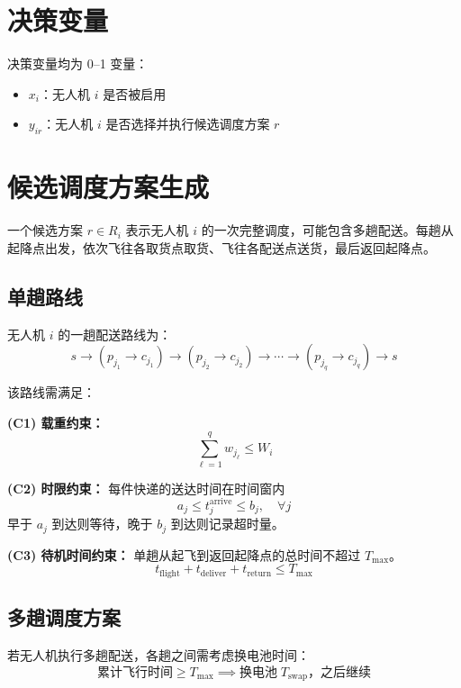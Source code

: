 \documentclass[12pt,a4paper]{article}
\begin{document}
\section{决策变量}

决策变量均为 0--1 变量：

\begin{itemize}[leftmargin=2em]
  \item $x_i$：无人机 $i$ 是否被启用
  \item $y_{ir}$：无人机 $i$ 是否选择并执行候选调度方案 $r$
\end{itemize}

\section{候选调度方案生成}

一个候选方案 $r \in R_i$ 表示无人机 $i$ 的一次完整调度，可能包含多趟配送。每趟从起降点出发，依次飞往各取货点取货、飞往各配送点送货，最后返回起降点。

\subsection{单趟路线}

无人机 $i$ 的一趟配送路线为：
\[
s \to (p_{j_1} \to c_{j_1}) \to (p_{j_2} \to c_{j_2}) \to \cdots \to (p_{j_q} \to c_{j_q}) \to s
\]

该路线需满足：

\textbf{(C1) 载重约束：}
\[
\sum_{\ell=1}^{q} w_{j_\ell} \leq W_i
\]

\textbf{(C2) 时限约束：} 每件快递的送达时间在时间窗内
\[
a_j \leq t_j^{\text{arrive}} \leq b_j, \quad \forall j
\]
早于 $a_j$ 到达则等待，晚于 $b_j$ 到达则记录超时量。

\textbf{(C3) 待机时间约束：} 单趟从起飞到返回起降点的总时间不超过 $T_{\max}$。
\[
t_{\text{flight}} + t_{\text{deliver}} + t_{\text{return}} \leq T_{\max}
\]

\subsection{多趟调度方案}

若无人机执行多趟配送，各趟之间需考虑换电池时间：
\[
\text{累计飞行时间} \geq T_{\max} \implies \text{换电池} \; T_{\text{swap}} \text{，之后继续}
\]
\end{document}
